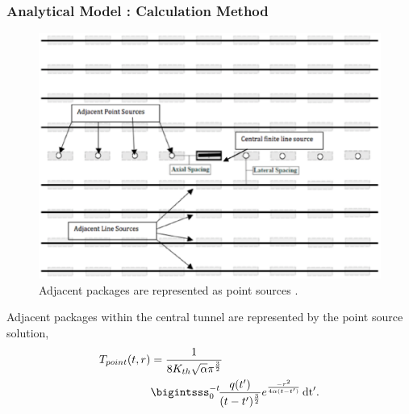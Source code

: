 \begin{frame}[ctb!]
\frametitle{Analytical Model : Calculation Method}
\begin{minipage}{0.3\textwidth}
\begin{figure}[h!]
  \begin{center}
    \includegraphics[width=\textwidth]{llnlConcept.eps}
  \end{center}
  \caption{Adjacent packages are represented as point sources
  \cite{sutton_investigations_2011}.}
  \label{fig:llnl}
\end{figure}
\end{minipage}
\hspace{0.1mm}
\begin{minipage}{0.6\textwidth}
 Adjacent packages within the central tunnel are represented by the point source 
 solution,
 \footnotesize{
  \begin{align}
    T_{point}(t,r) &= \frac{1}{8K_{th}\sqrt{\alpha}\pi^{\frac{3}{2}}}\nonumber\\
     &\bigintsss_0^{-t}\!\frac{q(t')}{(t-t')^{\frac{3}{2}}}e^{\frac{-r^2}{4\alpha(t-t')}}\,\mathrm{dt'}.
    \label{point}
  \end{align}
  }
  \end{minipage}
\end{frame}


